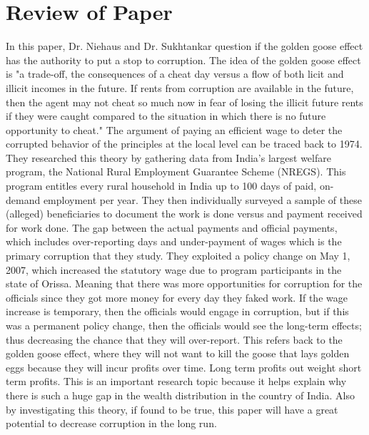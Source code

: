 \documentclass[12pt]{article}
\begin{document}
\section{Review of Paper}
In this paper, Dr. Niehaus and Dr. Sukhtankar question if the golden goose effect has the authority to put a stop to corruption. The idea of the golden goose effect is "a trade-off, the consequences of a cheat day versus a flow of both licit and illicit incomes in the future. If rents from corruption are available in the future, then the agent may not cheat so much now in fear of losing the illicit future rents if they were caught compared to the situation in which there is no future opportunity to cheat." The argument of paying an efficient wage to deter the corrupted behavior of the principles at the local level can be traced back to 1974.  They researched this theory by gathering data from India's largest welfare program, the National Rural Employment Guarantee Scheme (NREGS). This program entitles every rural household in India up to 100 days of paid, on-demand employment per year. They then individually surveyed a sample of these (alleged) beneficiaries to document the work is done versus and payment received for work done. The gap between the actual payments and official payments, which includes over-reporting days and under-payment of wages which is the primary corruption that they study. They exploited a policy change on May 1, 2007, which increased the statutory wage due to program participants in the state of Orissa. Meaning that there was more opportunities for corruption for the officials since they got more money for every day they faked work. If the wage increase is temporary, then the officials would engage in corruption, but if this was a permanent policy change, then the officials would see the long-term effects; thus decreasing the chance that they will over-report. This refers back to the golden goose effect, where they will not want to kill the goose that lays golden eggs because they will incur profits over time. Long term profits out weight short term profits. This is an important research topic because it helps explain why there is such a huge gap in the wealth distribution in the country of India. Also by investigating this theory, if found to be true, this paper will have a great potential to decrease corruption in the long run. 
\end{document}
